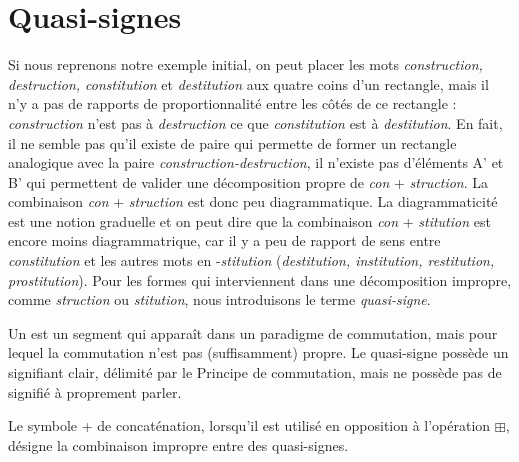 \section{Quasi-signes}\label{sec:2.2.4}

Si nous reprenons notre exemple initial, on peut placer les mots \textit{construction,} \textit{destruction, constitution} et \textit{destitution} aux quatre coins d’un rectangle, mais il n’y a pas de rapports de proportionnalité entre les côtés de ce rectangle : \textit{construction} n’est pas à \textit{destruction} ce que \textit{constitution} est à \textit{destitution}. En fait, il ne semble pas qu’il existe de paire qui permette de former un rectangle analogique avec la paire \textit{construction-destruction}, il n’existe pas d’éléments A’ et B’ qui permettent de valider une décomposition propre de \textit{con} + \textit{struction}. La combinaison \textit{con} + \textit{struction} est donc peu diagrammatique. La diagrammaticité est une notion graduelle et on peut dire que la combinaison \textit{con} + \textit{stitution} est encore moins diagrammatrique, car il y a peu de rapport de sens entre \textit{constitution} et les autres mots en -\textit{stitution} (\textit{destitution, institution, restitution, prostitution}). Pour les formes qui interviennent dans une décomposition impropre, comme \textit{struction} ou \textit{stitution}, nous introduisons le terme \textit{quasi-signe}.

{Un  est un segment qui apparaît dans un paradigme de commutation, mais pour lequel la commutation n’est pas (suffisamment) propre. Le quasi-signe possède un signifiant clair, délimité par le Principe de commutation, mais ne possède pas de signifié à proprement parler.}

Le symbole + de concaténation, lorsqu'il est utilisé en opposition à l’opération ${\boxplus}$, désigne la combinaison impropre entre des quasi-signes.

